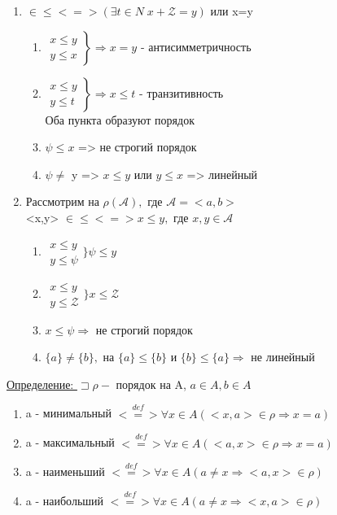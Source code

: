 \documentclass[12pt]{article}
\begin{document}
    \begin{enumerate}
        \item <x,y> $\in \leq <=>(\exists t \in N \; x+\mathcal{Z}=y)$ или x=y
        \begin{enumerate}
            \item $\left.
              \begin{aligned}
                x \leq y \\
                y \leq x
              \end{aligned}
              \right\} \Rightarrow x = y$ - антисимметричность
            \item $\left.
              \begin{aligned}
                x \leq y \\
                y \leq t
              \end{aligned}
              \right\} \Rightarrow x \leq t$ - транзитивность\\
              Оба пункта образуют порядок
            \item $\psi \leq x$ => не строгий порядок
            \item $\psi \not =$ y => $x \leq y$ или $y \leq x$ => линейный
        \end{enumerate}
        \item Рассмотрим на $\rho(\mathcal{A}),$ где $\mathcal{A}=<a,b>$\\
        <x,y> $\in \leq <=> x \leq y,$ где $x,y \in \mathcal{A}$
        \begin{enumerate}
            \item $\begin{aligned}
                x \leq y\\
                y \leq \psi
            \end{aligned}\Bigg\} \psi \leq y$
            \item $\begin{aligned}
                x \leq y\\
                y \leq \mathcal{Z}
            \end{aligned}\Bigg\} x \leq \mathcal{Z}$
            \item $x \leq \psi \Rightarrow$ не строгий порядок
            \item $\{a\} \not = \{b\},$ на $\{a\} \leq \{b\}$ и $\{b\} \leq \{a\} \Rightarrow $ не линейный
        \end{enumerate}
    \end{enumerate}
    \underline{Определение: }$\sqsupset \rho-$ порядок на A, $a \in A,b \in A$
    \begin{enumerate}
        \item a - минимальный $\overset{def}{<=>} \forall x \in A (<x,a> \in \rho \Rightarrow x =a)$
        \item a - максимальный $\overset{def}{<=>} \forall x \in A (<a,x> \in \rho \Rightarrow x =a)$
        \item a - наименьший $\overset{def}{<=>} \forall x \in A (a \not = x \Rightarrow <a,x> \in \rho)$
        \item a - наибольший $\overset{def}{<=>} \forall x \in A (a \not = x \Rightarrow <x,a> \in \rho)$
    \end{enumerate}
\end{document}
